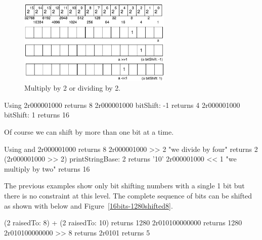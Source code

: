 \documentclass[a4paper,10pt,twoside]{book}
\begin{document}
\begin{figure}[h]
\begin{center}
\includegraphics[width=0.65\textwidth]{16bits-numberMultiplication}
\caption{Multiply by 2 or dividing by 2.\label{bitshiftmult}}
\end{center}
\end{figure}

\begin{code}{Using }
2r000001000 
	returns 8
2r000001000 bitShift: -1
	returns 4
2r000001000 bitShift: 1
	returns 16
\end{code}

Of course we can shift by more than one bit at a time. 

\begin{code}{Using \ct{>>} and \ct{<<}}
2r000001000 
	returns 8
2r000001000 >> 2					"we divide by four"
	returns 2
(2r000001000 >> 2) printStringBase: 2 
	returns '10'	
2r000001000 << 1					"we multiply by two"
	returns 16
\end{code}




The previous examples show only bit shifting numbers with a single 1 bit but there is no constraint at this level.
The complete sequence of bits can be shifted as shown with  below and Figure~\ref{16bits-1280shifted8}.

\begin{code}{}
(2 raisedTo: 8) + (2 raisedTo: 10) 
	returns 1280
2r010100000000
	returns 1280
2r010100000000 >> 8
	returns	2r0101
	returns 5
\end{code}


\end{document}
